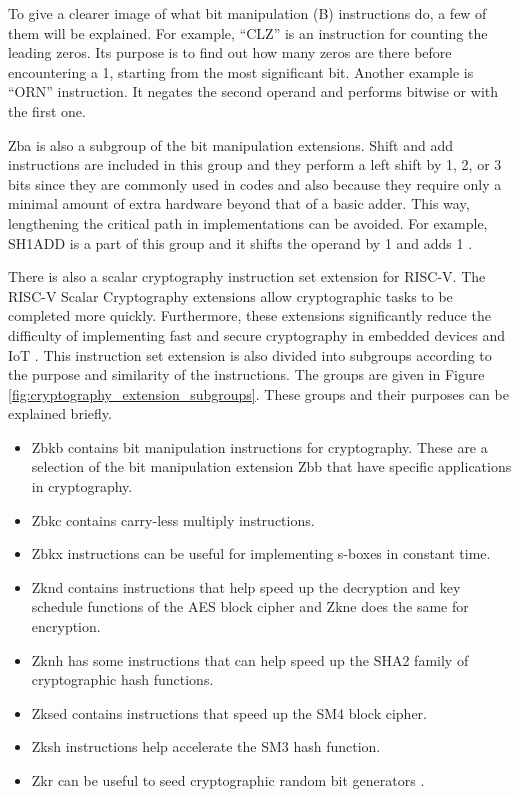 To give a clearer image of what bit manipulation (B) instructions do, a few of them will be explained. For example, “CLZ” is an instruction for counting the leading zeros. Its purpose is to find out how many zeros are there before encountering a 1, starting from the most significant bit. Another example is “ORN” instruction. It negates the second operand and performs bitwise or with the first one. 
\par
Zba is also a subgroup of the bit manipulation extensions. Shift and add instructions are included in this group and they perform a left shift by 1, 2, or 3 bits since they are commonly used in codes and also because they require only a minimal amount of extra hardware beyond that of a basic adder. This way, lengthening the critical path in implementations can be avoided. For example, SH1ADD is a part of this group and it shifts the operand by 1 and adds 1 \cite{bitmanipulationisaextensions}.
\par
There is also a scalar cryptography instruction set extension for RISC-V. The RISC-V Scalar Cryptography extensions allow cryptographic tasks to be completed more quickly. Furthermore, these extensions significantly reduce the difficulty of implementing fast and secure cryptography in embedded devices and IoT \cite{cryptogroups}. This instruction set extension is also divided into subgroups according to the purpose and similarity of the instructions. The groups are given in Figure \ref{fig:cryptography_extension_subgroups}. These groups and their purposes can be explained briefly.

\begin{itemize}
    \item Zbkb contains bit manipulation instructions for cryptography. These are a selection of the bit manipulation extension Zbb that have specific applications in cryptography. 
    \item Zbkc contains carry-less multiply instructions.
    \item Zbkx instructions can be useful for implementing s-boxes in constant time.
    \item Zknd contains instructions that help speed up the decryption and key schedule functions of the AES block cipher and Zkne does the same for encryption.
    \item Zknh has some instructions that can help speed up the SHA2 family of cryptographic hash functions.
    \item Zksed contains instructions that speed up the SM4 block cipher.
    \item Zksh instructions help accelerate the SM3 hash function.
    \item Zkr can be useful to seed cryptographic random bit generators \cite{cryptoextensiondoc}.
\end{itemize}

